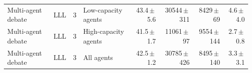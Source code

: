 \begin{table}[htbp]
\begin{tabular}{llclrrrr}
Multi-agent debate & LLL & 3 & Low-capacity agents & 43.4{\scriptsize\,$\pm$\,5.6} & 30544{\scriptsize\,$\pm$\,311} & 8429{\scriptsize\,$\pm$\,69} & 4.6{\scriptsize\,$\pm$\,4.0} \\
Multi-agent debate & LLL & 3 & High-capacity agents & 41.5{\scriptsize\,$\pm$\,1.7} & 11061{\scriptsize\,$\pm$\,97} & 9554{\scriptsize\,$\pm$\,144} & 2.7{\scriptsize\,$\pm$\,0.8} \\
Multi-agent debate & LLL & 3 & All agents & 42.5{\scriptsize\,$\pm$\,1.2} & 30785{\scriptsize\,$\pm$\,426} & 8495{\scriptsize\,$\pm$\,140} & 3.3{\scriptsize\,$\pm$\,3.1} \\
\bottomrule
\end{tabular}
\end{table}
